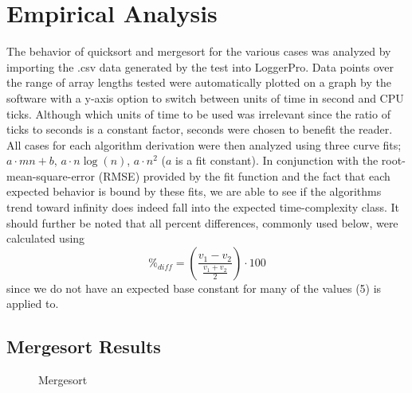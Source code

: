 \documentclass[11pt,letterpaper]{report}
\begin{document}
\section*{Empirical Analysis}
The behavior of quicksort and mergesort for the various cases was analyzed by importing the .csv data generated by the test into LoggerPro. Data points over the range of array lengths tested were automatically plotted on a graph by the software with a y-axis option to switch between units of time in second and CPU ticks.  Although which units of time to be used was irrelevant since the ratio of ticks to seconds is a constant factor, seconds were chosen to benefit the reader.
All cases for each algorithm derivation were then analyzed using three curve fits; $a \cdot mn+b$, $a \cdot n \log{}(n)$, $a \cdot n^2$ ($a$ is a fit constant). In conjunction with the root-mean-square-error (RMSE) provided by the fit function and the fact that each expected behavior is bound by these fits, we are able to see if the algorithms trend toward infinity does indeed fall into the expected time-complexity class. It should further be noted that all percent differences, commonly used below, were calculated using
\begin{equation} 
\%_{diff}  = (\frac{v_1-v_2}{\frac{v_1+v_2}{2}})  \cdot 100
\end{equation}
since we do not have an expected base constant for many of the values (5) is applied to. 



\subsection*{Mergesort Results}
\begin{figure}[h]
  \centering
  \hfill
  \hfill
  \caption{Mergesort}
\end{figure}
\end{document}
